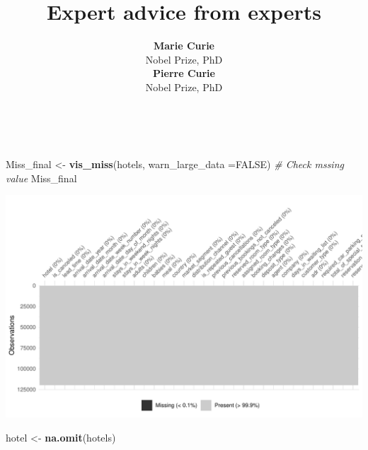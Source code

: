 \documentclass[11pt,a4paper,]{article}
\title{Expert advice from experts}
\author{\sf\Large\textbf{ Marie Curie}\\ {\sf\large Nobel Prize, PhD\\[0.5cm]} \sf\Large\textbf{ Pierre Curie}\\ {\sf\large Nobel Prize, PhD\\[0.5cm]}}
\date{\sf\Date~\Month~\Year}
\makeatletter
\newenvironment{Shaded}{\begin{snugshade}}{\end{snugshade}}
\newcommand{\CommentTok}[1]{\textcolor[rgb]{0.56,0.35,0.01}{\textit{#1}}}
\newcommand{\DataTypeTok}[1]{\textcolor[rgb]{0.13,0.29,0.53}{#1}}
\newcommand{\KeywordTok}[1]{\textcolor[rgb]{0.13,0.29,0.53}{\textbf{#1}}}
\newcommand{\NormalTok}[1]{#1}
\newcommand{\OtherTok}[1]{\textcolor[rgb]{0.56,0.35,0.01}{#1}}
\newcommand{\StringTok}[1]{\textcolor[rgb]{0.31,0.60,0.02}{#1}}
\def\titlepage{\front{\expandafter{\@title}}{\@author}{\@organization}}
\makeatother
\begin{document}
\titlepage

\begin{Shaded}
\begin{Highlighting}[]
\NormalTok{Miss_final <-}\StringTok{ }\KeywordTok{vis_miss}\NormalTok{(hotels, }\DataTypeTok{warn_large_data =}\OtherTok{FALSE}\NormalTok{) }\CommentTok{# Check mssing value }
\NormalTok{Miss_final}
\end{Highlighting}
\end{Shaded}

\includegraphics{tidy_files/figure-latex/check NA-1.pdf}

\begin{Shaded}
\begin{Highlighting}[]
\NormalTok{hotel <-}\StringTok{ }\KeywordTok{na.omit}\NormalTok{(hotels)}
\end{Highlighting}
\end{Shaded}
\end{document}
